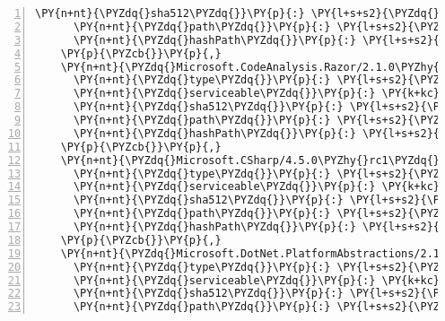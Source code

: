\begin{Verbatim}[commandchars=\\\{\},numbers=left,firstnumber=1,stepnumber=1,numberblanklines=0]
      \PY{n+nt}{\PYZdq{}sha512\PYZdq{}}\PY{p}{:} \PY{l+s+s2}{\PYZdq{}sha512\PYZhy{}zHEp2dwi/PJowaYZifF053fpkVATpnypsZ9C31sZVj0xsWe+Ai9Qpa4uEHwrgY+mm9hnCk7a3/L7Fm64NiLOWQ==\PYZdq{}}\PY{p}{,}
      \PY{n+nt}{\PYZdq{}path\PYZdq{}}\PY{p}{:} \PY{l+s+s2}{\PYZdq{}microsoft.codeanalysis.csharp/2.8.0\PYZhy{}beta3\PYZdq{}}\PY{p}{,}
      \PY{n+nt}{\PYZdq{}hashPath\PYZdq{}}\PY{p}{:} \PY{l+s+s2}{\PYZdq{}microsoft.codeanalysis.csharp.2.8.0\PYZhy{}beta3.nupkg.sha512\PYZdq{}}
    \PY{p}{\PYZcb{}}\PY{p}{,}
    \PY{n+nt}{\PYZdq{}Microsoft.CodeAnalysis.Razor/2.1.0\PYZhy{}rc1\PYZhy{}final\PYZdq{}}\PY{p}{:} \PY{p}{\PYZob{}}
      \PY{n+nt}{\PYZdq{}type\PYZdq{}}\PY{p}{:} \PY{l+s+s2}{\PYZdq{}package\PYZdq{}}\PY{p}{,}
      \PY{n+nt}{\PYZdq{}serviceable\PYZdq{}}\PY{p}{:} \PY{k+kc}{true}\PY{p}{,}
      \PY{n+nt}{\PYZdq{}sha512\PYZdq{}}\PY{p}{:} \PY{l+s+s2}{\PYZdq{}sha512\PYZhy{}mf04RsJvJTEzvoROShR07aWNdXA0cDucbBYP8+I/FSGEomsjo0JD/41Z8JSi2Qa3cdIawQcZqobumMIV91iTgw==\PYZdq{}}\PY{p}{,}
      \PY{n+nt}{\PYZdq{}path\PYZdq{}}\PY{p}{:} \PY{l+s+s2}{\PYZdq{}microsoft.codeanalysis.razor/2.1.0\PYZhy{}rc1\PYZhy{}final\PYZdq{}}\PY{p}{,}
      \PY{n+nt}{\PYZdq{}hashPath\PYZdq{}}\PY{p}{:} \PY{l+s+s2}{\PYZdq{}microsoft.codeanalysis.razor.2.1.0\PYZhy{}rc1\PYZhy{}final.nupkg.sha512\PYZdq{}}
    \PY{p}{\PYZcb{}}\PY{p}{,}
    \PY{n+nt}{\PYZdq{}Microsoft.CSharp/4.5.0\PYZhy{}rc1\PYZdq{}}\PY{p}{:} \PY{p}{\PYZob{}}
      \PY{n+nt}{\PYZdq{}type\PYZdq{}}\PY{p}{:} \PY{l+s+s2}{\PYZdq{}package\PYZdq{}}\PY{p}{,}
      \PY{n+nt}{\PYZdq{}serviceable\PYZdq{}}\PY{p}{:} \PY{k+kc}{true}\PY{p}{,}
      \PY{n+nt}{\PYZdq{}sha512\PYZdq{}}\PY{p}{:} \PY{l+s+s2}{\PYZdq{}sha512\PYZhy{}ZHQLb01QJvLRyqjt5ega6QIpz1BvCoTSa/dL9Ne/JfJzgyj5+zDMQHUTb9BfJege3yavV2FFdKIH2PQRqGCoHQ==\PYZdq{}}\PY{p}{,}
      \PY{n+nt}{\PYZdq{}path\PYZdq{}}\PY{p}{:} \PY{l+s+s2}{\PYZdq{}microsoft.csharp/4.5.0\PYZhy{}rc1\PYZdq{}}\PY{p}{,}
      \PY{n+nt}{\PYZdq{}hashPath\PYZdq{}}\PY{p}{:} \PY{l+s+s2}{\PYZdq{}microsoft.csharp.4.5.0\PYZhy{}rc1.nupkg.sha512\PYZdq{}}
    \PY{p}{\PYZcb{}}\PY{p}{,}
    \PY{n+nt}{\PYZdq{}Microsoft.DotNet.PlatformAbstractions/2.1.0\PYZhy{}rc1\PYZdq{}}\PY{p}{:} \PY{p}{\PYZob{}}
      \PY{n+nt}{\PYZdq{}type\PYZdq{}}\PY{p}{:} \PY{l+s+s2}{\PYZdq{}package\PYZdq{}}\PY{p}{,}
      \PY{n+nt}{\PYZdq{}serviceable\PYZdq{}}\PY{p}{:} \PY{k+kc}{true}\PY{p}{,}
      \PY{n+nt}{\PYZdq{}sha512\PYZdq{}}\PY{p}{:} \PY{l+s+s2}{\PYZdq{}sha512\PYZhy{}0DlJXmOj8zdAO8UmS7rNn7mxfeY2OuglvJHOw+MCoHvtoKe72BfTsqycZq4jko0qKskE6vUnoRJnZbFiXce95g==\PYZdq{}}\PY{p}{,}
      \PY{n+nt}{\PYZdq{}path\PYZdq{}}\PY{p}{:} \PY{l+s+s2}{\PYZdq{}microsoft.dotnet.platformabstractions/2.1.0\PYZhy{}rc1\PYZdq{}}\PY{p}{,}

\end{Verbatim}
